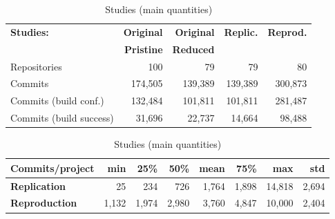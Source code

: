 \begin{table}[h]
\caption{Studies (main quantities)}
\label{table:statistics}
\begin{center}
\begin{tabular*}{\textwidth}{@{\extracolsep{\fill}}lrrrr}
\toprule
\textbf{Studies:}        & \textbf{Original} & \textbf{Original} & \textbf{Replic.} & \textbf{Reprod.} \\
                         & \textbf{Pristine} & \textbf{Reduced} \\
\midrule
Repositories             & 100               & 79                & 79               & 80      \\
Commits                  & 174,505           & 139,389           & 139,389          & 300,873 \\
Commits (build conf.)    & 132,484           & 101,811           & 101,811          & 281,487 \\
Commits (build success)  & 31,696            &  22,737           & 14,664           & 98,488  \\
\bottomrule
\end{tabular*}
\end{center}

\begin{center}
\begin{tabular*}{\textwidth}{@{\extracolsep{\fill}}lrrrrrrr}
\toprule 
\textbf{Commits/project}  & \bf{min} & \bf{25\%} & \bf{50\%} & \bf{mean}  & \bf{75\%} & \bf{max}  & \bf{std} \\

\midrule
\bf{Replication}   &       25 &          234 &         726 &    1,764 &       1,898 &    14,818 & 2,694 \\
\bf{Reproduction}  &    1,132 &        1,974 &       2,980 &    3,760 &       4,847 &    10,000 & 2,404 \\




\bottomrule
\end{tabular*}
\end{center}

\end{table}

